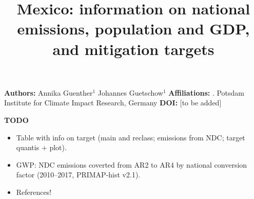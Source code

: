 \documentclass[12pt]{article}
\title{ \bfseries \color{PIKorange} Mexico: information on national emissions, population and GDP, and mitigation targets}
\begin{document}
 \maketitle

 \noindent \textbf{Authors:} \newline
 \indent Annika Guenther$^{1}$ \newline
 \indent Johannes Guetschow$^{1}$ \newline
 \noindent \textbf{Affiliations:} \newline
 . Potsdam Institute for Climate Impact Research, Germany \newline
 \noindent \textbf{DOI:} [to be added] \newline

 \textbf{TODO}
 \begin{itemize}
 \item Table with info on target (main and reclass; emissions from NDC; target quantis + plot).
 \item GWP: NDC emissions coverted from AR2 to AR4 by national conversion factor (2010--2017, PRIMAP-hist v2.1).
 \item References!
 \end{itemize}

\end{document}
